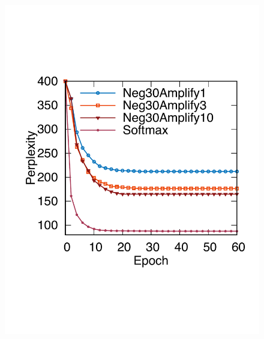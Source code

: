 \begin{figure}[ht]
\begin{minipage}{.31\textwidth}
		\label{fig:neg5}
	\end{minipage}%
	\begin{minipage}{.31\textwidth}
		\centering
		\captionsetup{justification=centering,margin=0.1cm}
		\includegraphics[width=1\linewidth]{Graph/negSamp/L2Neg30_60_Nolog.pdf}


\end{minipage}
\end{figure}
